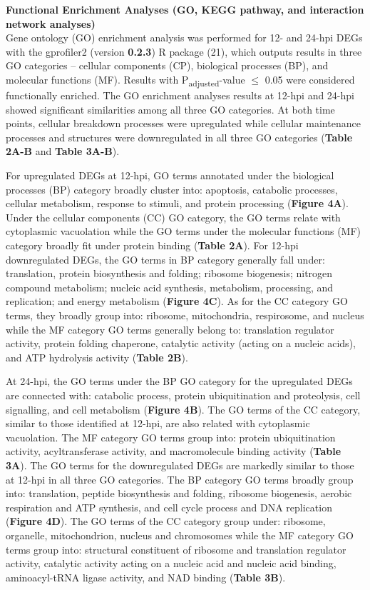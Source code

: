 \documentclass[
]{article}
\begin{document}
\textbf{Functional Enrichment Analyses (GO, KEGG pathway, and
interaction network analyses)}\\
Gene ontology (GO) enrichment analysis was performed for 12- and 24-hpi
DEGs with the gprofiler2 (version \textbf{0.2.3}) R package (21), which
outputs results in three GO categories -- cellular components (CP),
biological processes (BP), and molecular functions (MF). Results with
P\textsubscript{adjusted}-value \(\leq\) 0.05 were considered
functionally enriched. The GO enrichment analyses results at 12-hpi and
24-hpi showed significant similarities among all three GO categories. At
both time points, cellular breakdown processes were upregulated while
cellular maintenance processes and structures were downregulated in all
three GO categories (\textbf{Table 2A-B} and \textbf{Table 3A-B}).

For upregulated DEGs at 12-hpi, GO terms annotated under the biological
processes (BP) category broadly cluster into: apoptosis, catabolic
processes, cellular metabolism, response to stimuli, and protein
processing (\textbf{Figure 4A}). Under the cellular components (CC) GO
category, the GO terms relate with cytoplasmic vacuolation while the GO
terms under the molecular functions (MF) category broadly fit under
protein binding (\textbf{Table 2A}). For 12-hpi downregulated DEGs, the
GO terms in BP category generally fall under: translation, protein
biosynthesis and folding; ribosome biogenesis; nitrogen compound
metabolism; nucleic acid synthesis, metabolism, processing, and
replication; and energy metabolism (\textbf{Figure 4C}). As for the CC
category GO terms, they broadly group into: ribosome, mitochondria,
respirosome, and nucleus while the MF category GO terms generally belong
to: translation regulator activity, protein folding chaperone, catalytic
activity (acting on a nucleic acids), and ATP hydrolysis activity
(\textbf{Table 2B}).

At 24-hpi, the GO terms under the BP GO category for the upregulated
DEGs are connected with: catabolic process, protein ubiquitination and
proteolysis, cell signalling, and cell metabolism (\textbf{Figure 4B}).
The GO terms of the CC category, similar to those identified at 12-hpi,
are also related with cytoplasmic vacuolation. The MF category GO terms
group into: protein ubiquitination activity, acyltransferase activity,
and macromolecule binding activity (\textbf{Table 3A}). The GO terms for
the downregulated DEGs are markedly similar to those at 12-hpi in all
three GO categories. The BP category GO terms broadly group into:
translation, peptide biosynthesis and folding, ribosome biogenesis,
aerobic respiration and ATP synthesis, and cell cycle process and DNA
replication (\textbf{Figure 4D}). The GO terms of the CC category group
under: ribosome, organelle, mitochondrion, nucleus and chromosomes while
the MF category GO terms group into: structural constituent of ribosome
and translation regulator activity, catalytic activity acting on a
nucleic acid and nucleic acid binding, aminoacyl-tRNA ligase activity,
and NAD binding (\textbf{Table 3B}).
\end{document}

